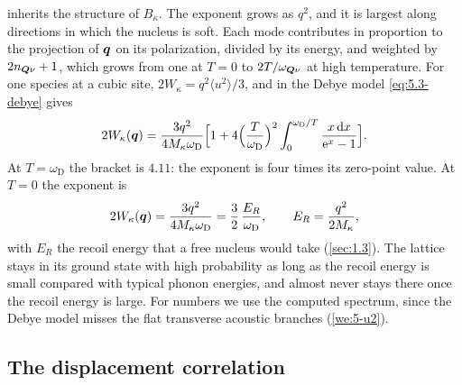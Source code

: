  inherits the structure of $B_\kappa$. The exponent grows as $q^2$, and it is largest along directions in which the nucleus is soft. Each mode contributes in proportion to the projection of $\bm{q}$ on its polarization, divided by its energy, and weighted by $2n_{\bm{Q}\nu} + 1$, which grows from one at $T = 0$ to $2T/\omega_{\bm{Q}\nu}$ at high temperature. For one species at a cubic site, $2W_\kappa = q^2\langle u^2\rangle/3$, and in the Debye model \cref{eq:5.3-debye} gives
\begin{equation}
  2W_\kappa(\bm{q}) = \frac{3q^2}{4M_\kappa\omega_{\mathrm{D}}}\Bigl[1 + 4\Bigl(\frac{T}{\omega_{\mathrm{D}}}\Bigr)^2\int_0^{\omega_{\mathrm{D}}/T}\frac{x\,\mathrm{d} x}{\mathrm{e}^x - 1}\Bigr] .
  \label{eq:D.15-debye}
\end{equation}
At $T = \omega_{\mathrm{D}}$ the bracket is $4.11$: the exponent is four times its zero-point value. At $T = 0$ the exponent is
\begin{equation*}
  2W_\kappa(\bm{q}) = \frac{3q^2}{4M_\kappa\omega_{\mathrm{D}}} = \frac32\,\frac{E_R}{\omega_{\mathrm{D}}} , \qquad E_R = \frac{q^2}{2M_\kappa} ,
\end{equation*}
with $E_R$ the recoil energy that a free nucleus would take (\cref{sec:1.3}). The lattice stays in its ground state with high probability as long as the recoil energy is small compared with typical phonon energies, and almost never stays there once the recoil energy is large. For numbers we use the computed spectrum, since the Debye model misses the flat transverse acoustic branches (\cref{we:5-u2}).

\subsection{The displacement correlation}

